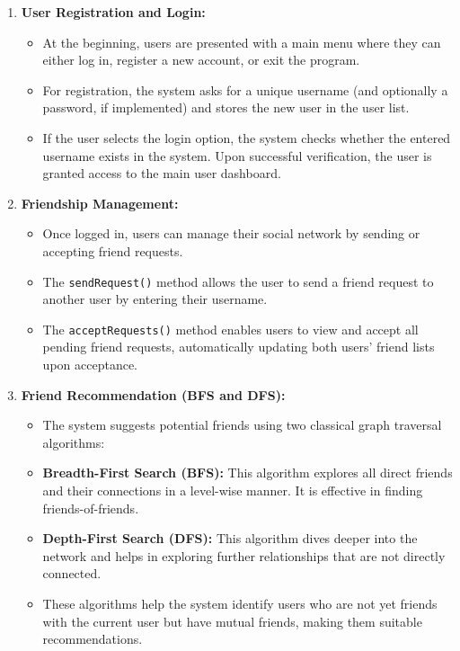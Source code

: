 \documentclass[12pt]{report}
\begin{document}
\begin{enumerate}
    \item \textbf{User Registration and Login:}
    \begin{itemize}
        \item At the beginning, users are presented with a main menu where they can either log in, register a new account, or exit the program.
        \item For registration, the system asks for a unique username (and optionally a password, if implemented) and stores the new user in the user list.
        \item If the user selects the login option, the system checks whether the entered username exists in the system. Upon successful verification, the user is granted access to the main user dashboard.
    \end{itemize}
    
    \item \textbf{Friendship Management:}
    \begin{itemize}
        \item Once logged in, users can manage their social network by sending or accepting friend requests.
        \item The \texttt{sendRequest()} method allows the user to send a friend request to another user by entering their username.
        \item The \texttt{acceptRequests()} method enables users to view and accept all pending friend requests, automatically updating both users' friend lists upon acceptance.
    \end{itemize}

    \item \textbf{Friend Recommendation (BFS and DFS):}
    \begin{itemize}
        \item The system suggests potential friends using two classical graph traversal algorithms:
        \item \textbf{Breadth-First Search (BFS):} This algorithm explores all direct friends and their connections in a level-wise manner. It is effective in finding friends-of-friends.
        \item \textbf{Depth-First Search (DFS):} This algorithm dives deeper into the network and helps in exploring further relationships that are not directly connected.
        \item These algorithms help the system identify users who are not yet friends with the current user but have mutual friends, making them suitable recommendations.
    \end{itemize}


\end{enumerate}
\end{document}
